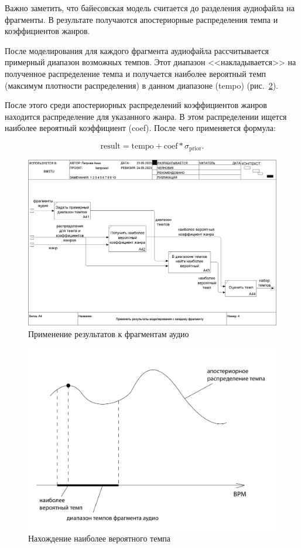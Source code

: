 Важно заметить, что байесовская модель считается до разделения аудиофайла на фрагменты. В результате получаются апостериорные распределения темпа и коэффициентов жанров.

После моделирования для каждого фрагмента аудиофайла рассчитывается примерный диапазон возможных темпов. Этот диапазон <<накладывается>> на полученное распределение темпа и получается наиболее вероятный темп (максимум плотности распределения) в данном диапазоне (tempo) (рис.~\ref{img:res_tempo}).

После этого среди апостериорных распределений коэффициентов жанров находится распределение для указанного жанра. В этом распределении ищется наиболее вероятный коэффициент (coef). После чего применяется формула:

\begin{equation}
	\text{result} = \text{tempo} + \text{coef} * \sigma_{\text{prior}}.
\end{equation}

\begin{figure}[h]
	\centering
	\includegraphics[scale=0.25]{inc/img/tempo_idef/04_A4.png}
	\caption{Применение результатов к фрагментам аудио}
	\label{img:tempo_3}
\end{figure}

\begin{figure}[h]
	\centering
	\includegraphics[scale=0.5]{svg/res_tempo.pdf}
	\caption{Нахождение наиболее вероятного темпа}
	\label{img:res_tempo}
\end{figure}


